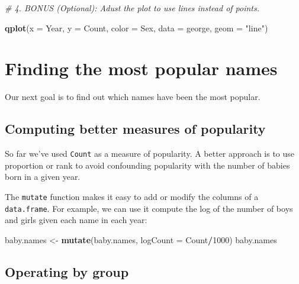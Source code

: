 \documentclass[]{book}
\newenvironment{Shaded}{\begin{snugshade}}{\end{snugshade}}
\newcommand{\KeywordTok}[1]{\textcolor[rgb]{0.13,0.29,0.53}{\textbf{#1}}}
\newcommand{\DataTypeTok}[1]{\textcolor[rgb]{0.13,0.29,0.53}{#1}}
\newcommand{\DecValTok}[1]{\textcolor[rgb]{0.00,0.00,0.81}{#1}}
\newcommand{\StringTok}[1]{\textcolor[rgb]{0.31,0.60,0.02}{#1}}
\newcommand{\CommentTok}[1]{\textcolor[rgb]{0.56,0.35,0.01}{\textit{#1}}}
\newcommand{\OperatorTok}[1]{\textcolor[rgb]{0.81,0.36,0.00}{\textbf{#1}}}
\newcommand{\NormalTok}[1]{#1}
\begin{document}
\begin{Shaded}
\begin{Highlighting}[]
\CommentTok{# 4.  BONUS (Optional): Adust the plot to use lines instead of points.}
\end{Highlighting}
\end{Shaded}

\begin{Shaded}
\begin{Highlighting}[]
\KeywordTok{qplot}\NormalTok{(}\DataTypeTok{x =}\NormalTok{ Year, }\DataTypeTok{y =}\NormalTok{ Count, }\DataTypeTok{color =}\NormalTok{ Sex, }\DataTypeTok{data =}\NormalTok{ george, }\DataTypeTok{geom =} \StringTok{"line"}\NormalTok{)}
\end{Highlighting}
\end{Shaded}

\section{Finding the most popular
names}\label{finding-the-most-popular-names}

Our next goal is to find out which names have been the most popular.

\subsection{Computing better measures of
popularity}\label{computing-better-measures-of-popularity}

So far we've used \texttt{Count} as a measure of popularity. A better
approach is to use proportion or rank to avoid confounding popularity
with the number of babies born in a given year.

The \texttt{mutate} function makes it easy to add or modify the columns
of a \texttt{data.frame}. For example, we can use it compute the log of
the number of boys and girls given each name in each year:

\begin{Shaded}
\begin{Highlighting}[]
\NormalTok{baby.names <-}\StringTok{ }\KeywordTok{mutate}\NormalTok{(baby.names, }\DataTypeTok{logCount =}\NormalTok{ Count}\OperatorTok{/}\DecValTok{1000}\NormalTok{)}
\NormalTok{baby.names}
\end{Highlighting}
\end{Shaded}

\subsection{Operating by group}\label{operating-by-group}
\end{document}
